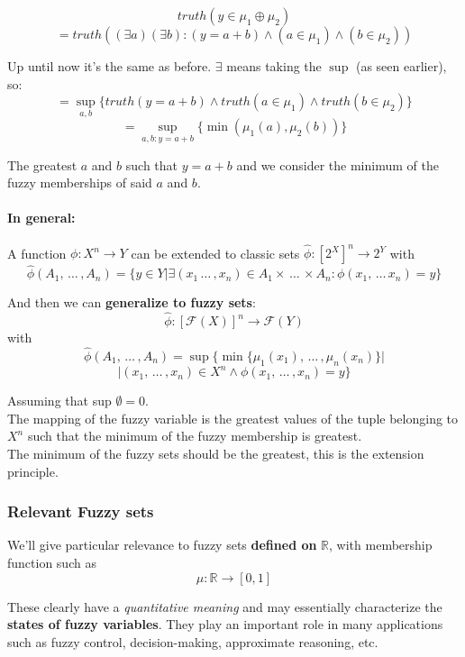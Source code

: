 $$ truth (y \in \mu_1 \oplus \mu_2) $$
$$ = truth ((\exists a) (\exists b): (y = a + b) \wedge (a \in \mu_1) \wedge (b \in \mu_2)) $$

Up until now it's the same as before. $\exists$ means taking the $\sup$ (as seen earlier), so:
$$ = \sup_{a,b} \{truth (y = a + b) \wedge truth (a \in \mu_1) \wedge truth (b \in \mu_2)\}$$
$$ = \sup_{a,b: y=a+b} \{\min (\mu_1(a), \mu_2(b))\}$$

The greatest $a$ and $b$ such that $y = a+b$ and we consider the minimum of the fuzzy memberships of said $a$ and $b$.\\

\newpage

\paragraph{In general:} A function $\phi: X^n \rightarrow Y$ can be extended to classic sets $\hat \phi: [2^X]^n \rightarrow 2^Y$ with 
$$ \hat \phi (A_1, \, \dots \, , A_n) = \{y \in Y | \exists (x_1 \, \dots \, , x_n) \in A_1 \times \, \dots \, \times A_n : \phi (x_1, \, \dots \, x_n) = y\} $$

And then we can \textbf{generalize to fuzzy sets}:
$$ \hat \phi: [\mathcal{F} (X)]^n \rightarrow \mathcal{F} (Y) $$
with 
$$ \hat \phi (A_1, \, \dots \, , A_n) = \sup \{ \min \{ \mu_1 (x_1), \, \dots \, , \mu_n (x_n) \} |$$ 
$$| (x_1, \, \dots \, , x_n) \in X^n \wedge \phi (x_1, \, \dots \, , x_n) = y \}$$

Assuming that sup $\emptyset = 0$.\\

The mapping of the fuzzy variable is the greatest values of the tuple belonging to $X^n$ such that the minimum of the fuzzy membership is greatest. \\

The minimum of the fuzzy sets should be the greatest, this is the extension principle.\\

\newpage

\subsubsection{Relevant Fuzzy sets}

We'll give particular relevance to fuzzy sets \textbf{defined on} $\mathbb{R}$, with membership function such as
$$ \mu : \mathbb{R} \rightarrow [0,1] $$

These clearly have a \textit{quantitative meaning} and may essentially characterize the \textbf{states of fuzzy variables}. They play an important role in many applications such as fuzzy control, decision-making, approximate reasoning, etc.\\

